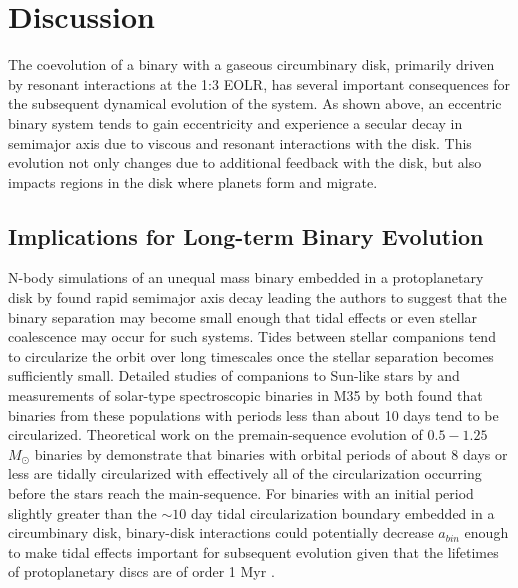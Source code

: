 
\section{Discussion} \label{discuss}
The coevolution of a binary with a gaseous circumbinary disk, primarily driven by resonant interactions at the 1:3 EOLR, has several important consequences for the subsequent dynamical evolution of the system.  As shown above, an eccentric binary system tends to gain eccentricity and experience a secular decay in semimajor axis due to viscous and resonant interactions with the disk.  This evolution not only changes due to additional feedback with the disk, but also impacts regions in the disk where planets form and migrate.

	
\subsection{Implications for Long-term Binary Evolution} \label{tidal_implications}

N-body simulations of an unequal mass binary embedded in a
protoplanetary disk by \citet{Artymowicz1991} found rapid semimajor axis decay leading the
authors to suggest that the binary separation may become small enough that tidal effects or even stellar coalescence may occur for such systems.  Tides 
between stellar companions tend to circularize the orbit over long timescales once the stellar separation becomes sufficiently small.  Detailed studies of 
companions to Sun-like stars by \citet{Raghavan10} and measurements of solar-type spectroscopic binaries in M35 by \citet{Meibom05} both found that 
binaries from these populations with periods less than about 10 days tend to be circularized.  Theoretical work on the premain-sequence evolution of 
$0.5-1.25$ $M_{\odot}$ binaries by \citet{Zahn89} demonstrate that binaries with orbital periods of about 8 days or less are tidally circularized with effectively all 
of the circularization occurring before the stars reach the main-sequence.  For binaries with an initial period slightly greater than the $\sim 10$ day tidal 
circularization boundary embedded in a circumbinary disk, binary-disk interactions could potentially decrease $a_{bin}$ enough to make tidal effects important 
for subsequent evolution given that the lifetimes of protoplanetary discs are of order 1 Myr \citep{Haisch2001}.

